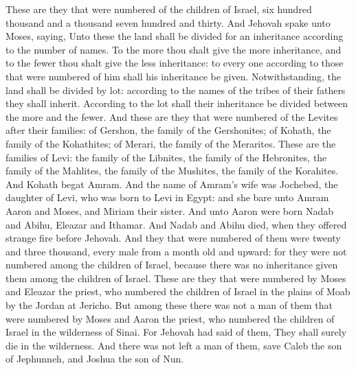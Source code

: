 These are they that were numbered of the children of Israel, six hundred thousand and a thousand seven hundred and thirty.  And Jehovah spake unto Moses, saying, Unto these the land shall be divided for an inheritance according to the number of names. To the more thou shalt give the more inheritance, and to the fewer thou shalt give the less inheritance: to every one according to those that were numbered of him shall his inheritance be given. Notwithstanding, the land shall be divided by lot: according to the names of the tribes of their fathers they shall inherit. According to the lot shall their inheritance be divided between the more and the fewer.  And these are they that were numbered of the Levites after their families: of Gershon, the family of the Gershonites; of Kohath, the family of the Kohathites; of Merari, the family of the Merarites. These are the families of Levi: the family of the Libnites, the family of the Hebronites, the family of the Mahlites, the family of the Mushites, the family of the Korahites. And Kohath begat Amram. And the name of Amram’s wife was Jochebed, the daughter of Levi, who was born to Levi in Egypt: and she bare unto Amram Aaron and Moses, and Miriam their sister. And unto Aaron were born Nadab and Abihu, Eleazar and Ithamar. And Nadab and Abihu died, when they offered strange fire before Jehovah. And they that were numbered of them were twenty and three thousand, every male from a month old and upward: for they were not numbered among the children of Israel, because there was no inheritance given them among the children of Israel.  These are they that were numbered by Moses and Eleazar the priest, who numbered the children of Israel in the plains of Moab by the Jordan at Jericho. But among these there was not a man of them that were numbered by Moses and Aaron the priest, who numbered the children of Israel in the wilderness of Sinai. For Jehovah had said of them, They shall surely die in the wilderness. And there was not left a man of them, save Caleb the son of Jephunneh, and Joshua the son of Nun. 

